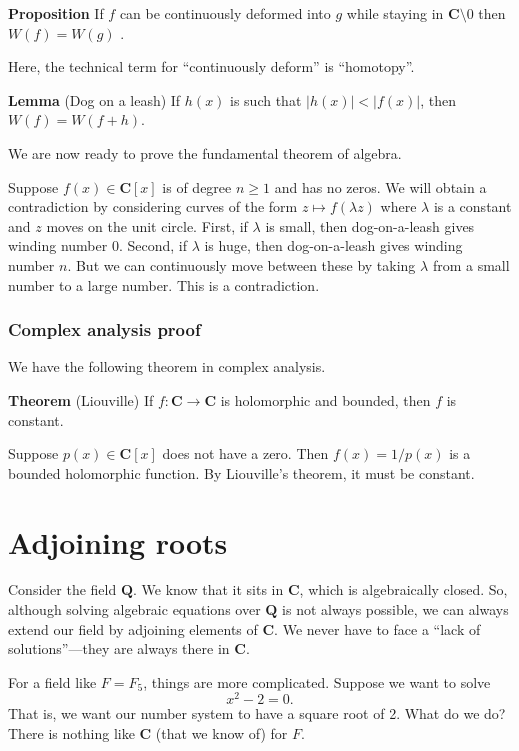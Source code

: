 \documentclass[11pt]{article}
\begin{document}
\textbf{\textbf{Proposition}} If \(f\) can be continuously deformed into \(g\) while staying in \(\mathbf{C} \setminus 0\) then \(W(f) = W(g)\) .

Here, the technical term for ``continuously deform'' is ``homotopy''.

\textbf{\textbf{Lemma}} (Dog on a leash)
If \(h(x)\) is such that \(|h(x)| < |f(x)|\), then \(W(f) = W(f+h)\).

We are now ready to prove the fundamental theorem of algebra.

Suppose \(f(x) \in \mathbf{C}[x]\) is of degree \(n \geq 1\) and has no zeros.
We will obtain a contradiction by considering curves of the form \(z \mapsto f(\lambda z)\) where \(\lambda\) is a constant and \(z\) moves on the unit circle.
First, if \(\lambda\) is small, then dog-on-a-leash gives winding number 0.
Second, if \(\lambda\) is huge, then dog-on-a-leash gives winding number \(n\).
But we can continuously move between these by taking \(\lambda\) from a small number to a large number.
This is a contradiction.
\subsubsection{Complex analysis proof}
\label{sec:orge1b874e}
We have the following theorem in complex analysis.

\textbf{\textbf{Theorem}} (Liouville)
If \(f \colon \mathbf{C} \to \mathbf{C}\) is holomorphic and bounded, then \(f\) is constant.

Suppose \(p(x) \in \mathbf{C}[x]\) does not have a zero.
Then \(f(x) = 1/p(x)\) is a bounded holomorphic function.
By Liouville's theorem, it must be constant.
\section{Adjoining roots}
\label{sec:orgbb3953b}
Consider the field \(\mathbf{Q}\).
We know that it sits in \(\mathbf{C}\), which is algebraically closed.
So, although solving algebraic equations over \(\mathbf{Q}\) is not always possible, we can always extend our field by adjoining elements of \(\mathbf{C}\).
We never have to face a ``lack of solutions''---they are always there in \(\mathbf{C}\).

For a field like \(F = F_{5}\), things are more complicated.
Suppose we want to solve
\[ x^{2} - 2 = 0.\]
That is, we want our number system to have a square root of 2.
What do we do?
There is nothing like \(\mathbf{C}\) (that we know of) for \(F\).
\end{document}
